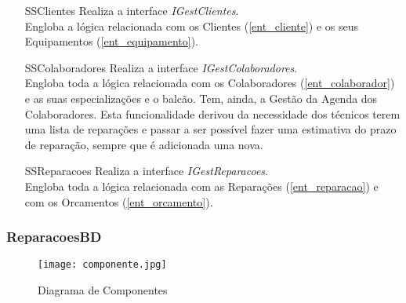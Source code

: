 \documentclass[../relatorio.tex]{subfiles}
\begin{document}
\begin{itemize}
    \item[SSClientes] {
          Realiza a interface \textit{IGestClientes}.\\
          Engloba a lógica relacionada com os Clientes (\ref{ent_cliente})
          e os seus Equipamentos (\ref{ent_equipamento}).
          }
    \item[SSColaboradores] {
          Realiza a interface \textit{IGestColaboradores}.\\
          Engloba toda a lógica relacionada com os Colaboradores (\ref{ent_colaborador})
          e as suas especializações e o balcão.
          Tem, ainda, a Gestão da Agenda dos Colaboradores.
          Esta funcionalidade derivou da necessidade dos técnicos terem uma lista de reparações
          e passar a ser possível fazer uma estimativa do prazo de reparação, sempre que é adicionada
          uma nova.
          }
    \item[SSReparacoes] {
          Realiza a interface \textit{IGestReparacoes}.\\
          Engloba toda a lógica relacionada com as Reparações (\ref{ent_reparacao})
          e com os Orcamentos (\ref{ent_orcamento}).\\
          }
\end{itemize}

\subsubsection*{ReparacoesBD} \label{sec:reparacoes_bd}


\begin{figure}
    \texttt{[image: componente.jpg]}
    \caption{Diagrama de Componentes} \label{img:diagrama_componentes}
\end{figure}
\end{document}
